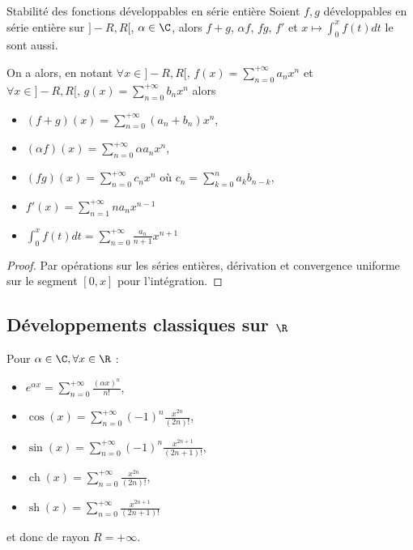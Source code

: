 \begin{proposition}{Stabilité des fonctions développables en série entière}{}
    Soient $f, g$ développables en série entière sur $]-R, R[$, $\alpha \in \C$, alors 
    $f + g$, $\alpha f$, $fg$, $f'$ et $x \mapsto \int_0^x f(t) dt$ le sont aussi. 

\end{proposition}

On a alors, en notant $\displaystyle \forall x \in ]-R, R[, \, f(x) = \sum_{n = 0}^{+\infty} a_n x^n$ et
    $\displaystyle \forall x \in ]-R, R[, \, g(x) = \sum_{n = 0}^{+\infty} b_n x^n$ alors 
    
    \begin{itemize}
        \item $\displaystyle (f + g)(x) = \sum_{n = 0}^{+\infty} (a_n + b_n) x^n$, 
        \item $\displaystyle (\alpha f)(x) = \sum_{n = 0}^{+\infty} \alpha a_n x^n$,
        \item $\displaystyle (fg)(x) = \sum_{n = 0}^{+\infty} c_n x^n$ où $\displaystyle c_n = \sum_{k = 0}^n a_k b_{n - k}$,
        \item $\displaystyle f'(x) = \sum_{n = 1}^{+\infty} n a_n x^{n - 1}$
        \item $\displaystyle \int_0^x f(t) dt = \sum_{n = 0}^{+\infty} \frac{a_n}{n + 1} x^{n + 1}$
    \end{itemize}

\begin{proof}
    Par opérations sur les séries entières, dérivation et convergence uniforme sur le segment 
    $[0, x]$ pour l'intégration.
\end{proof}


\subsection{Développements classiques sur \texorpdfstring{$\R$}{R} }

\begin{proposition}{}{}
    Pour $\alpha \in \C, \forall x \in \R$ : 
    \begin{itemize}
        \item $\displaystyle e^{\alpha x} = \sum_{n = 0}^{+\infty} \frac{(\alpha x)^n}{n!}$,
        \item $\displaystyle \cos(x) = \sum_{n = 0}^{+\infty} (-1)^n \frac{x^{2n}}{(2n)!}$,
        \item $\displaystyle \sin(x) = \sum_{n = 0}^{+\infty} (-1)^n \frac{x^{2n + 1}}{(2n + 1)!}$,
        \item $\displaystyle \operatorname{ch } (x) = \sum_{n = 0}^{+\infty} \frac{x^{2n}}{(2n)!}$,
        \item $\displaystyle \operatorname{sh } (x) = \sum_{n = 0}^{+\infty} \frac{x^{2n + 1}}{(2n + 1)!}$
    \end{itemize}
    et donc de rayon $R = + \infty$.
\end{proposition}


